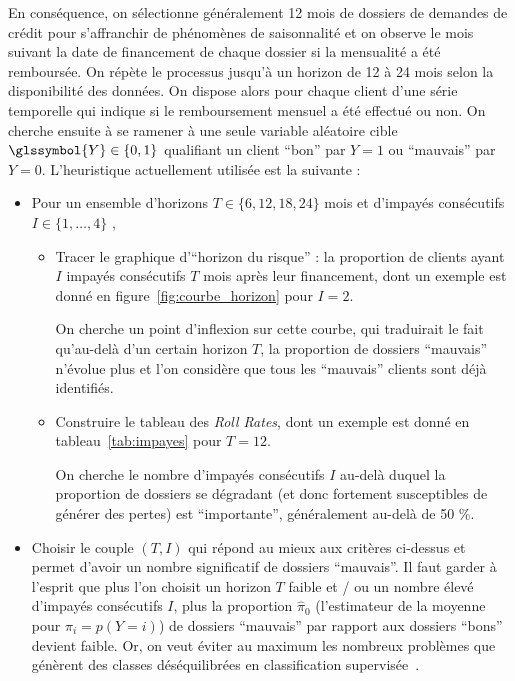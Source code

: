 En conséquence, on sélectionne généralement 12 mois de dossiers de demandes de crédit pour s'affranchir de phénomènes de saisonnalité et on observe le mois suivant la date de financement de chaque dossier si la mensualité a été remboursée. On répète le processus jusqu'à un horizon de 12 à 24 mois selon la disponibilité des données. On dispose alors pour chaque client d'une série temporelle qui indique si le remboursement mensuel a été effectué ou non. On cherche ensuite à se ramener à une seule variable aléatoire cible $\glssymbol{Y} \in \{0,1\}$ qualifiant un client ``bon'' par $Y=1$ ou ``mauvais'' par $Y=0$. L'heuristique actuellement utilisée est la suivante :
\begin{itemize}
\item Pour un ensemble d'horizons $T \in \{6,12,18,24\}$ mois et d'impayés consécutifs $I \in \{1,\dots,4\}$ ,
\begin{itemize}
\item Tracer le graphique d'``horizon du risque'' : la proportion de clients ayant $I$ impayés consécutifs $T$ mois après leur financement, dont un exemple est donné en figure~\ref{fig:courbe_horizon} pour $I = 2$.

On cherche un point d'inflexion sur cette courbe, qui traduirait le fait qu'au-delà d'un certain horizon $T$, la proportion de dossiers ``mauvais'' n'évolue plus et l'on considère que tous les ``mauvais'' clients sont déjà identifiés.
\item Construire le tableau des \textit{Roll Rates}, dont un exemple est donné en tableau~\ref{tab:impayes} pour $T = 12$.

On cherche le nombre d'impayés consécutifs $I$ au-delà duquel la proportion de dossiers se dégradant (et donc fortement susceptibles de générer des pertes) est ``importante'', généralement au-delà de 50 \%. 
\end{itemize}
\item Choisir le couple $(T,I)$ qui répond au mieux aux critères ci-dessus et permet d'avoir un nombre significatif de dossiers ``mauvais''. Il faut garder à l'esprit que plus l'on choisit un horizon $T$ faible et / ou un nombre élevé d'impayés consécutifs $I$, plus la proportion $\hat{\pi}_0$ (l'estimateur de la moyenne pour $\pi_i = p(Y=i)$) de dossiers ``mauvais'' par rapport aux dossiers ``bons'' devient faible.
Or, on veut éviter au maximum les nombreux problèmes que génèrent des classes déséquilibrées en classification supervisée~\cite{sun2009classification}.
\end{itemize}

